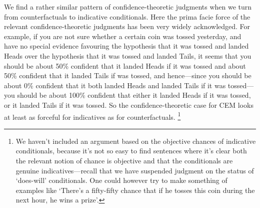 \documentclass[If.tex]{subfiles}
\begin{document}
We find a rather similar pattern of confidence-theoretic judgments when we turn from counterfactuals to indicative conditionals. Here the prima facie force of the relevant confidence-theoretic judgments has been very widely acknowledged. For example, if you are not sure whether a certain coin was tossed yesterday, and have no special evidence favouring the hypothesis that it was tossed and landed Heads over the hypothesis that it was tossed and landed Tails, it seems that you should be about 50\% confident that it landed Heads if it was tossed and about 50\% confident that it landed Tails if was tossed, and hence---since you should be about 0\% confident that it both landed Heads and landed Tails if it was tossed---you should be about 100\% confident that either it landed Heads if it was tossed, or it landed Tails if it was tossed. So the confidence-theoretic case for CEM looks at least as forceful for
indicatives as for counterfactuals.%
\footnote{We haven't included an argument based on the objective chances of indicative conditionals, because it's not so easy to find sentences where it's clear both the relevant notion of chance is objective and that the conditionals are genuine indicatives---recall that we have suspended judgment on the status of ‘does-will’ conditionals. One could however try to make something of examples like `There's a fifty-fifty chance that if he tosses this coin during the next hour, he wins a prize'.}
\end{document}

